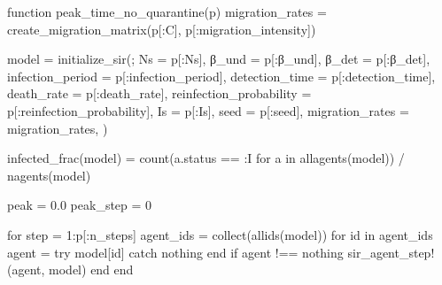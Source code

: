 \documentclass[
  12pt,
  a4paper,
  DIV=11,
  numbers=noendperiod]{scrreprt}
\newenvironment{Shaded}{\begin{snugshade}}{\end{snugshade}}
\newcommand{\ConstantTok}[1]{\textcolor[rgb]{0.56,0.35,0.01}{#1}}
\newcommand{\ControlFlowTok}[1]{\textcolor[rgb]{0.00,0.23,0.31}{#1}}
\newcommand{\FloatTok}[1]{\textcolor[rgb]{0.68,0.00,0.00}{#1}}
\newcommand{\FunctionTok}[1]{\textcolor[rgb]{0.28,0.35,0.67}{#1}}
\newcommand{\KeywordTok}[1]{\textcolor[rgb]{0.00,0.23,0.31}{#1}}
\newcommand{\NormalTok}[1]{\textcolor[rgb]{0.00,0.23,0.31}{#1}}
\newcommand{\OperatorTok}[1]{\textcolor[rgb]{0.37,0.37,0.37}{#1}}
\begin{document}
\begin{Shaded}
\begin{Highlighting}[]
\KeywordTok{function} \FunctionTok{peak\_time\_no\_quarantine}\NormalTok{(p)}
\NormalTok{    migration\_rates }\OperatorTok{=} \FunctionTok{create\_migration\_matrix}\NormalTok{(p[}\OperatorTok{:}\NormalTok{C], p[}\OperatorTok{:}\NormalTok{migration\_intensity])}

\NormalTok{    model }\OperatorTok{=} \FunctionTok{initialize\_sir}\NormalTok{(;}
\NormalTok{        Ns }\OperatorTok{=}\NormalTok{ p[}\OperatorTok{:}\NormalTok{Ns],}
\NormalTok{        β\_und }\OperatorTok{=}\NormalTok{ p[}\OperatorTok{:}\NormalTok{β\_und],}
\NormalTok{        β\_det }\OperatorTok{=}\NormalTok{ p[}\OperatorTok{:}\NormalTok{β\_det],}
\NormalTok{        infection\_period }\OperatorTok{=}\NormalTok{ p[}\OperatorTok{:}\NormalTok{infection\_period],}
\NormalTok{        detection\_time }\OperatorTok{=}\NormalTok{ p[}\OperatorTok{:}\NormalTok{detection\_time],}
\NormalTok{        death\_rate }\OperatorTok{=}\NormalTok{ p[}\OperatorTok{:}\NormalTok{death\_rate],}
\NormalTok{        reinfection\_probability }\OperatorTok{=}\NormalTok{ p[}\OperatorTok{:}\NormalTok{reinfection\_probability],}
\NormalTok{        Is }\OperatorTok{=}\NormalTok{ p[}\OperatorTok{:}\NormalTok{Is],}
\NormalTok{        seed }\OperatorTok{=}\NormalTok{ p[}\OperatorTok{:}\NormalTok{seed],}
\NormalTok{        migration\_rates }\OperatorTok{=}\NormalTok{ migration\_rates,}
\NormalTok{    )}

    \FunctionTok{infected\_frac}\NormalTok{(model) }\OperatorTok{=} \FunctionTok{count}\NormalTok{(a.status }\OperatorTok{==} \OperatorTok{:}\NormalTok{I }\ControlFlowTok{for}\NormalTok{ a }\KeywordTok{in} \FunctionTok{allagents}\NormalTok{(model)) }\OperatorTok{/} \FunctionTok{nagents}\NormalTok{(model)}

\NormalTok{    peak }\OperatorTok{=} \FloatTok{0.0}
\NormalTok{    peak\_step }\OperatorTok{=} \FloatTok{0}

    \ControlFlowTok{for}\NormalTok{ step }\OperatorTok{=} \FloatTok{1}\OperatorTok{:}\NormalTok{p[}\OperatorTok{:}\NormalTok{n\_steps]}
\NormalTok{        agent\_ids }\OperatorTok{=} \FunctionTok{collect}\NormalTok{(}\FunctionTok{allids}\NormalTok{(model))}
        \ControlFlowTok{for}\NormalTok{ id }\KeywordTok{in}\NormalTok{ agent\_ids}
\NormalTok{            agent }\OperatorTok{=} \ControlFlowTok{try}
\NormalTok{                model[id]}
            \ControlFlowTok{catch}
                \ConstantTok{nothing}
            \ControlFlowTok{end}
            \ControlFlowTok{if}\NormalTok{ agent }\OperatorTok{!==} \ConstantTok{nothing}
                \FunctionTok{sir\_agent\_step!}\NormalTok{(agent, model)}
            \ControlFlowTok{end}
        \ControlFlowTok{end}


\end{Highlighting}
\end{Shaded}
\end{document}
